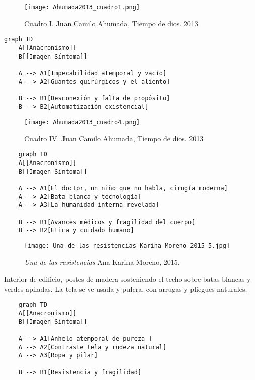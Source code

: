 \clearpage
\begin{figure}[h!]
    \centering
    \texttt{[image: Ahumada2013\_cuadro1.png]}
    \caption{Cuadro I. Juan Camilo Ahumada, Tiempo de dios. 2013}
    \label{fig:Ahumada2013_cuadro1}
\end{figure}

\parencite[p. 10]{Ahumada2013}

\small
\singlespacing \begin{verbatim}
graph TD
    A[[Anacronismo]]
    B[[Imagen-Síntoma]]
    
    A --> A1[Impecabilidad atemporal y vacío]
    A --> A2[Guantes quirúrgicos y el aliento]

    B --> B1[Desconexión y falta de propósito]
    B --> B2[Automatización existencial]

\end{verbatim}
\normalsize

\clearpage
\begin{figure}[h!]
    \centering
    \texttt{[image: Ahumada2013\_cuadro4.png]}
    \caption{Cuadro IV. Juan Camilo Ahumada, Tiempo de dios. 2013}
    \label{fig:Ahumada2013_cuadro4}
\end{figure}

\parencite[p. 12]{Ahumada2013}

\small
\singlespacing \begin{verbatim}
    graph TD
    A[[Anacronismo]]
    B[[Imagen-Síntoma]]
    
    A --> A1[El doctor, un niño que no habla, cirugía moderna]
    A --> A2[Bata blanca y tecnología]
    A --> A3[La humanidad interna revelada]
    
    B --> B1[Avances médicos y fragilidad del cuerpo]
    B --> B2[Ética y cuidado humano]

\end{verbatim}
\normalsize


\clearpage
\begin{figure}[h!]
    \centering
    \texttt{[image: Una de las resistencias Karina Moreno 2015\_5.jpg]}
    \caption{\textit{Una de las resistencias} Ana Karina Moreno, 2015.}
    \label{fig:KarinaMoreno2015}
\end{figure}

Interior de edificio, postes de madera sosteniendo el techo sobre batas blancas y verdes apiladas. La tela se ve usada y pulcra, con arrugas y pliegues naturales.

\small
\singlespacing \begin{verbatim}
    graph TD
    A[[Anacronismo]]
    B[[Imagen-Síntoma]]
    
    A --> A1[Anhelo atemporal de pureza ]
    A --> A2[Contraste tela y rudeza natural]
    A --> A3[Ropa y pilar]

    B --> B1[Resistencia y fragilidad]

\end{verbatim}
\normalsize


